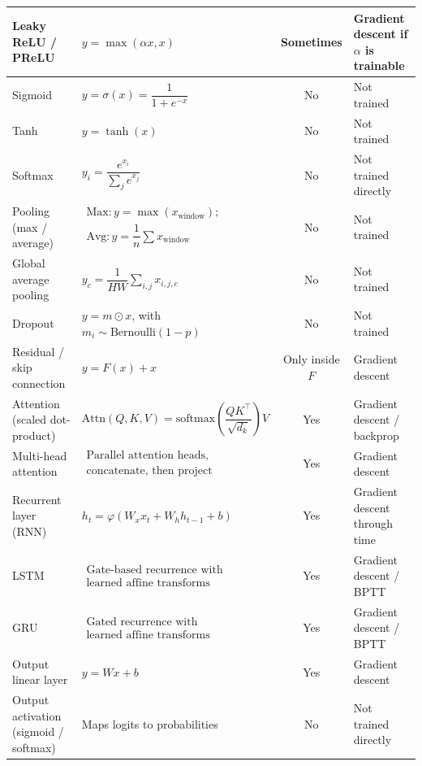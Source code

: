 \documentclass[aps, prb, superscriptaddress, longbibliography]{revtex4-2}
\renewcommand{\phi}{\varphi}
\numberwithin{equation}{section}
\begin{document}
\begin{table}[htbp]
\begin{tabular}{|l|p{7.2cm}|c|p{3.2cm}|}
\hline
Leaky ReLU / PReLU & $y = \max(\alpha x, x)$ & Sometimes & Gradient descent if $\alpha$ is trainable \\
\hline
Sigmoid & $y = \sigma(x) = \dfrac{1}{1+e^{-x}}$ & No & Not trained \\
\hline
Tanh & $y = \tanh(x)$ & No & Not trained \\
\hline
Softmax & $y_i = \dfrac{e^{x_i}}{\sum_j e^{x_j}}$ & No & Not trained directly \\
\hline
Pooling (max / average) & $\begin{array}{c}
\text{Max}: y = \max(x_{\text{window}});\\ 
\text{Avg}: y = \dfrac{1}{n}\sum x_{\text{window}}\end{array}$ & No & Not trained \\
\hline
Global average pooling & $y_c = \dfrac{1}{HW}\sum_{i,j} x_{i,j,c}$ & No & Not trained \\
\hline
Dropout & $y = m \odot x$, with $m_i \sim \mathrm{Bernoulli}(1-p)$ & No & Not trained \\
\hline
Residual / skip connection & $y = F(x) + x$ & Only inside $F$ & Gradient descent \\
\hline
Attention (scaled dot-product) & $\mathrm{Attn}(Q,K,V)=\mathrm{softmax}\!\left(\dfrac{QK^\top}{\sqrt{d_k}}\right)V$ & Yes & Gradient descent / backprop \\
\hline
Multi-head attention & $\begin{array}{c}
\text{Parallel attention heads,}\\ \text{concatenate, then project}\end{array}$ & Yes & Gradient descent \\
\hline
Recurrent layer (RNN) & $h_t=\phi(W_x x_t + W_h h_{t-1}+b)$ & Yes & Gradient descent through time \\
\hline
LSTM & $\begin{array}{c}
\text{Gate-based recurrence with}\\ \text{learned affine transforms}\end{array}$ & Yes & Gradient descent / BPTT \\
\hline
GRU & $\begin{array}{c}
\text{Gated recurrence with}\\
\text{learned affine transforms}\end{array}$ & Yes & Gradient descent / BPTT \\
\hline
Output linear layer & $y = Wx+b$ & Yes & Gradient descent \\
\hline
Output activation (sigmoid / softmax) & Maps logits to probabilities & No & Not trained directly \\
\hline
\end{tabular}
\end{table}
\end{document}
